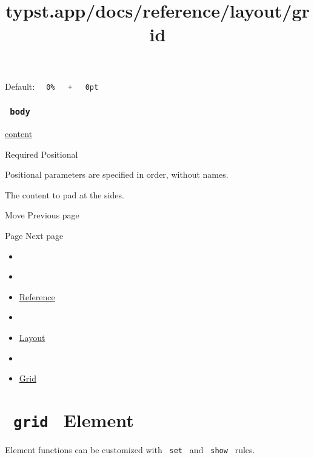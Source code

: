Default:
\texttt{\ }{\texttt{\ 0\%\ }}\texttt{\ }{\texttt{\ +\ }}\texttt{\ }{\texttt{\ 0pt\ }}\texttt{\ }

\subsubsection{\texorpdfstring{\texttt{\ body\ }}{ body }}\label{parameters-body}

\href{/docs/reference/foundations/content/}{content}

{Required} {{ Positional }}

\label{parameters-body-positional-tooltip}
Positional parameters are specified in order, without names.

The content to pad at the sides.

\href{/docs/reference/layout/move/}{\pandocbounded{}}

{ Move } { Previous page }

\href{/docs/reference/layout/page/}{\pandocbounded{}}

{ Page } { Next page }


\title{typst.app/docs/reference/layout/grid}

\begin{itemize}
\tightlist
\item
  \href{/docs}{}
\item
  
\item
  \href{/docs/reference/}{Reference}
\item
  
\item
  \href{/docs/reference/layout/}{Layout}
\item
  
\item
  \href{/docs/reference/layout/grid/}{Grid}
\end{itemize}

\section{\texorpdfstring{\texttt{\ grid\ } {{ Element
}}}{ grid   Element }}\label{summary}

\label{element-tooltip}
Element functions can be customized with \texttt{\ set\ } and
\texttt{\ show\ } rules.

